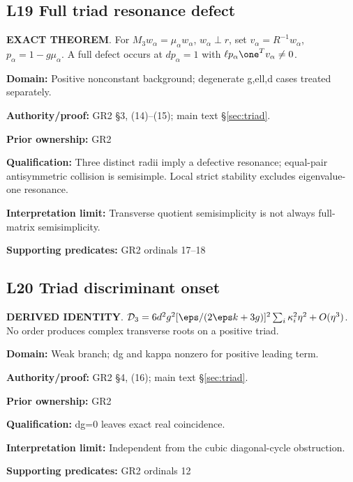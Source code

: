 \par\noindent\begin{minipage}{\linewidth}
\subsection*{L19 Full triad resonance defect}
\textbf{EXACT THEOREM}. For \(M_3w_\alpha=\mu_\alpha w_\alpha\), \(w_\alpha\perp r\), set \(v_\alpha=R^{-1}w_\alpha\), \(p_\alpha=1-g\mu_\alpha\). A full defect occurs at \(dp_\alpha=1\) with \(\ell p_\alpha\one^Tv_\alpha\ne0\).\par
\textbf{Domain:} Positive nonconstant background; degenerate g,ell,d cases treated separately.\par
\textbf{Authority/proof:} GR2 \S{}3, (14)--(15); main text \S\ref{sec:triad}.\par
\textbf{Prior ownership:} GR2\par
\textbf{Qualification:} Three distinct radii imply a defective resonance; equal-pair antisymmetric collision is semisimple. Local strict stability excludes eigenvalue-one resonance.\par
\textbf{Interpretation limit:} Transverse quotient semisimplicity is not always full-matrix semisimplicity.\par
\textbf{Supporting predicates:} GR2 ordinals 17--18\par
\end{minipage}\par\medskip
\par\noindent\begin{minipage}{\linewidth}
\subsection*{L20 Triad discriminant onset}
\textbf{DERIVED IDENTITY}. \(\mathcal D_3=6d^2g^2[\eps/(2\eps k+3g)]^2\sum_i\kappa_i^2\eta^2+O(\eta^3)\). No order produces complex transverse roots on a positive triad.\par
\textbf{Domain:} Weak branch; dg and kappa nonzero for positive leading term.\par
\textbf{Authority/proof:} GR2 \S{}4, (16); main text \S\ref{sec:triad}.\par
\textbf{Prior ownership:} GR2\par
\textbf{Qualification:} dg=0 leaves exact real coincidence.\par
\textbf{Interpretation limit:} Independent from the cubic diagonal-cycle obstruction.\par
\textbf{Supporting predicates:} GR2 ordinals 12\par
\end{minipage}\par\medskip
